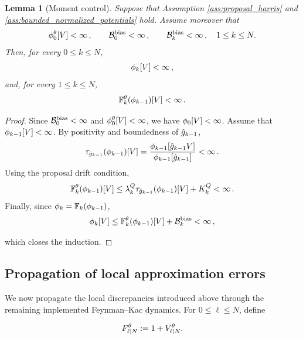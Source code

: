 \documentclass[11pt]{article}
\theoremstyle{plain}
\newtheorem{lemma}[theorem]{Lemma}
\theoremstyle{definition}
\theoremstyle{remark}
\begin{document}
\begin{lemma}[Moment control]
\label{lem:finite_moments_lambda_bias}
Suppose that Assumption \ref{ass:proposal_harris} and \ref{ass:bounded_normalized_potentials}
hold. Assume moreover that
$$
\approxfilter{0}[V]<\infty \eqsp,
\qquad
\mathcal B_0^{\rm bias} < \infty \eqsp,
\qquad
\mathcal B_k^{\rm bias}< \infty \eqsp,
\quad 1\le k\le N.
$$
Then, for every $0\le k\le N$,
$$
\filter{k}[V]<\infty \eqsp,
$$
and, for every $1\le k\le N$,
$$
\filtertransform{k}[\theta](\filter{k-1})[V] < \infty \eqsp.
$$
\end{lemma}

\begin{proof}
Since
$\mathcal B_0^{\rm bias}<\infty$ and
$\approxfilter{0}[V]<\infty$,
we have $\filter{0}[V]<\infty$. Assume that $\filter{k-1}[V]<\infty$. By positivity and boundedness of $\approxpot{k-1}$,
$$
\tau_{\approxpot{k-1}}(\filter{k-1})[V]
= \frac{ \filter{k-1}[\approxpot{k-1}V] }{ \filter{k-1}[\approxpot{k-1}] } < \infty \eqsp.
$$
Using the proposal drift condition,
$$
\filtertransform{k}[\theta](\filter{k-1})[V] \le \lambda_k^Q \tau_{\approxpot{k-1}}(\filter{k-1})[V]
+ K_k^Q < \infty \eqsp.
$$
Finally, since
$\filter{k}=\filtertransform{k}(\filter{k-1})$,
$$
\filter{k}[V] \le \filtertransform{k}[\theta](\filter{k-1})[V] + \mathcal B_k^{\rm bias} < \infty \eqsp,
$$

which closes the induction.
\end{proof}



\subsection{Propagation of local approximation errors}

We now propagate the local discrepancies introduced above through the remaining implemented Feynman--Kac dynamics. For $0\le \ell\le N$, define

$$
F_{\ell|N}^{\theta}
\eqdef
1+\twistedlyap{\ell}{N}[\theta].
$$
\end{document}
